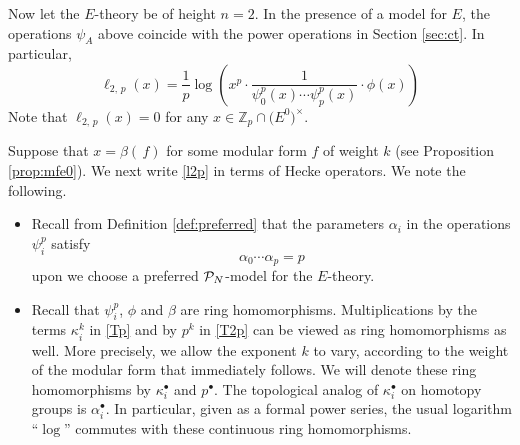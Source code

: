 \documentclass{gtpart}
\theoremstyle{definition}
\theoremstyle{remark}
\newcommand{\mb}[1]{\mathbb{#1}}
\newcommand{\CP}{{\cal P}}
\newcommand{\BZ}{{\mb Z}}
\newcommand{\A}{\alpha}
\newcommand{\B}{\beta}
\newcommand{\K}{\kappa}
\renewcommand{\=}{\approx}
\renewcommand{\-}{\sim}
\numberwithin{equation}{section}
\begin{document}
Now let the $E$-theory be of height $n = 2$.  In the presence of a model for 
$E$, the operations $\psi_A$ above coincide with the power operations in Section 
\ref{sec:ct}.  In particular, 
\begin{equation}
 \label{l2p}
 \ell_{2,\,p}(x) = \frac{1}{p} \log \left( x^p \cdot 
 \frac{1}{\psi^p_0(x) \cdots \psi^p_p(x)} \cdot \phi(x) \right) 
\end{equation}
Note that $\ell_{2,\,p}(x) = 0$ for any 
$x \in \BZ_p \cap \big( E^0 \big)^{\!\times}$.  

Suppose that $x = \B(\,f)$ for some modular form $f$ of weight $k$ (see 
Proposition \ref{prop:mfe0}).  We next write \eqref{l2p} in terms of Hecke 
operators.  We note the following.  

\begin{itemize}
 \item Recall from Definition \ref{def:preferred} that the parameters $\A_i$ in 
 the operations $\psi^p_i$ satisfy 
 \[
  \A_0 \cdots \A_p = p 
 \]
 upon we choose a preferred $\CP_N$-model for the $E$-theory.  

 \item Recall that $\psi^p_i$, $\phi$ and $\B$ are ring homomorphisms.  
 Multiplications by the terms $\K_i^k$ in \eqref{Tp} and by $p^k$ in \eqref{T2p} 
 can be viewed as ring homomorphisms as well.  More precisely, we allow the 
 exponent $k$ to vary, according to the weight of the modular form that 
 immediately follows.  We will denote these ring homomorphisms by $\K_i^\bullet$ 
 and $p^\bullet$.  The topological analog of $\K_i^\bullet$ on homotopy groups 
 is $\A_i^\bullet$.  In particular, given as a formal power series, the usual 
 logarithm ``$\log$'' commutes with these continuous ring homomorphisms.  
\end{itemize}
\end{document}
